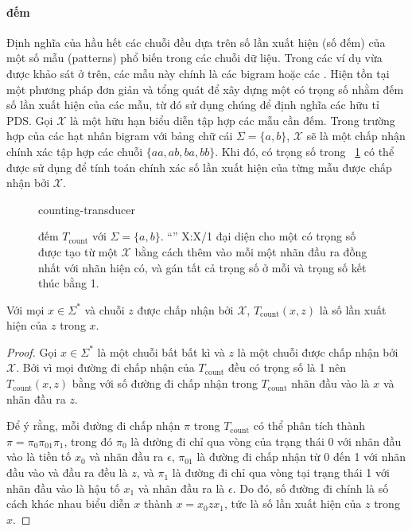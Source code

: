 \paragraph{\protect{} đếm}

Định nghĩa của hầu hết các  chuỗi đều dựa trên số lần xuất hiện (số
đếm) của một số mẫu (patterns) phổ biến trong các chuỗi dữ liệu. Trong các ví
dụ vừa được khảo sát ở trên, các mẫu này chính là các bigram hoặc các . Hiện tồn tại một phương pháp đơn giản và tổng quát để xây dựng một
 có trọng số nhằm đếm số lần xuất hiện của các mẫu, từ đó sử
dụng chúng để định nghĩa các  hữu tỉ PDS. Gọi $\mathcal{X}$ là một
 hữu hạn biểu diễn tập hợp các mẫu cần đếm. Trong trường
hợp của các hạt nhân bigram với bảng chữ cái $\Sigma = \{a, b\}$, $\mathcal X$
sẽ là một  chấp nhận chính xác tập hợp các chuỗi $\{aa, ab, ba,
bb\}$.  Khi đó,  có trọng số trong
\figurename~\ref{fig:counting-transducer} có thể được sử dụng để tính toán
chính xác số lần xuất hiện của từng mẫu được chấp nhận bởi $\mathcal X$.

\begin{figure}[htbp]
  \centering
  {counting-transducer}
  \caption[\protect{} đếm]{ đếm $T_\text{count}$
  với $\Sigma = \{a, b\}$. ``'' X:X/1 đại diện cho một
   có trọng số được tạo từ một  $\mathcal{X}$ bằng
  cách thêm vào mỗi  một nhãn đầu ra đồng nhất với nhãn hiện có,
  và gán tất cả trọng số ở mỗi  và trọng số kết thúc bằng 1.}
  \label{fig:counting-transducer}
\end{figure}

\begin{thm}
  Với mọi $x \in \Sigma^\ast$ và chuỗi $z$ được chấp nhận bởi $\mathcal{X}$,
  $T_\text{count}(x, z)$ là số lần xuất hiện của $z$ trong $x$.
\end{thm}

\begin{proof}
  Gọi $x \in \Sigma^\ast$ là một chuỗi bất bất kì và $z$ là một chuỗi được chấp
  nhận bởi $\mathcal{X}$. Bởi vì mọi đường đi chấp nhận của $T_\text{count}$
  đều có trọng số là 1 nên $T_\text{count}(x, z)$ bằng với số đường đi chấp
  nhận trong $T_\text{count}$ nhãn đầu vào là $x$ và nhãn đầu ra $z$.

  Để ý rằng, mỗi đường đi chấp nhận $\pi$ trong $T_\text{count}$ có thể phân
  tích thành $\pi = \pi_0\pi_{01}\pi_1$, trong đó $\pi_0$ là đường đi chỉ qua
  vòng của trạng thái 0 với nhãn đầu vào là tiền tố $x_0$ và nhãn đầu ra
  $\epsilon$, $\pi_{01}$ là đường đi chấp nhận từ 0 đến 1 với nhãn đầu vào và
  đầu ra đều là $z$, và $\pi_1$ là đường đi chỉ qua vòng tại trạng thái 1 với
  nhãn đầu vào là hậu tố $x_1$ và nhãn đầu ra là $\epsilon$. Do đó, số đường đi
  chính là số cách khác nhau biểu diễn $x$ thành $x=x_0zx_1$, tức là số lần
  xuất hiện của $z$ trong $x$.
\end{proof}

